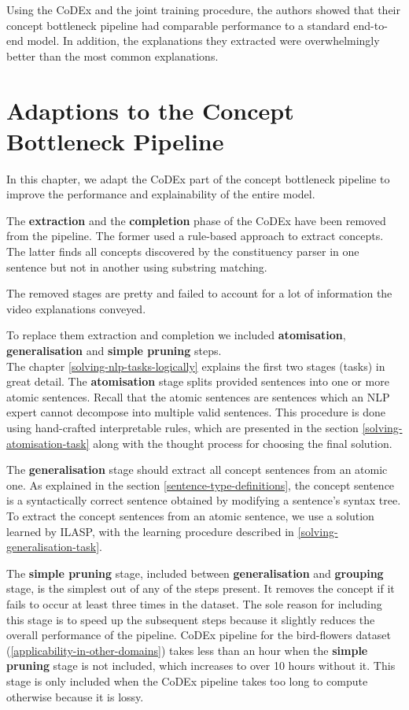 Using the CoDEx and the joint training procedure, the authors showed that their concept bottleneck pipeline had comparable performance to a standard end-to-end model.
In addition, the explanations they extracted were overwhelmingly better than the most common explanations.

\section{Adaptions to the Concept Bottleneck Pipeline}

In this chapter, we adapt the CoDEx part of the concept bottleneck pipeline to improve the performance and explainability of the entire model.

The \textbf{extraction} and the \textbf{completion} phase of the CoDEx have been removed from the pipeline.
The former used a rule-based approach to extract concepts.
The latter finds all concepts discovered by the constituency parser in one sentence but not in another using substring matching.

The removed stages are pretty and failed to account for a lot of information the video explanations conveyed.

To replace them extraction and completion we included \textbf{atomisation}, \textbf{generalisation} and \textbf{simple pruning} steps. \\
The chapter \ref{solving-nlp-tasks-logically} explains the first two stages (tasks) in great detail.
The \textbf{atomisation} stage splits provided sentences into one or more atomic sentences. 
Recall that the atomic sentences are sentences which an NLP expert cannot decompose into multiple valid sentences.
This procedure is done using hand-crafted interpretable rules, which are presented in the section \ref{solving-atomisation-task} along with the thought process for choosing the final solution.

The \textbf{generalisation} stage should extract all concept sentences from an atomic one. 
As explained in the section \ref{sentence-type-definitions}, the concept sentence is a syntactically correct sentence obtained by modifying a sentence's syntax tree.
To extract the concept sentences from an atomic sentence, we use a solution learned by ILASP, with the learning procedure described in \ref{solving-generalisation-task}.

The \textbf{simple pruning} stage, included between \textbf{generalisation} and \textbf{grouping} stage, is the simplest out of any of the steps present. 
It removes the concept if it fails to occur at least three times in the dataset.
The sole reason for including this stage is to speed up the subsequent steps because it slightly reduces the overall performance of the pipeline.
CoDEx pipeline for the bird-flowers dataset \cite{RefWorks:RefID:69-wah2011caltech-ucsd} (\ref{applicability-in-other-domains}) takes less than an hour when the \textbf{simple pruning} stage is not included, which increases to over 10 hours without it.
This stage is only included when the CoDEx pipeline takes too long to compute otherwise because it is lossy.

